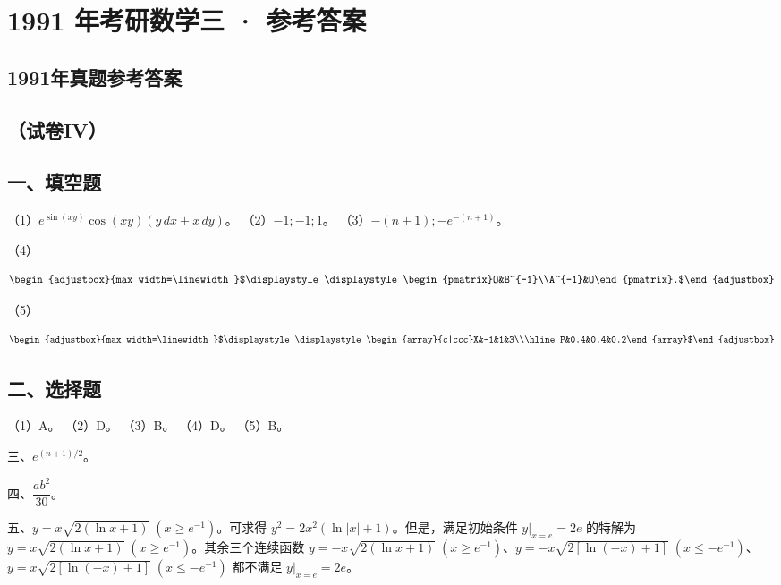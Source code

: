 \documentclass[UTF8,12pt]{ctexart}
\newcommand{\fitmath}[1]{\begin{adjustbox}{max width=\linewidth}$\displaystyle #1$\end{adjustbox}}
\begin{document}
\section*{1991 年考研数学三 · 参考答案}
\subsection*{1991年真题参考答案}

\subsection*{（试卷IV）}

\subsection*{一、填空题}

（1）\(\displaystyle e^{\sin(xy)}\cos(xy)(y\,dx+x\,dy)\)。 （2）\(\displaystyle -1;-1;1\)。 （3）\(\displaystyle -(n+1);-e^{-(n+1)}\)。


（4）


\[\fitmath{\displaystyle \begin{pmatrix}O&B^{-1}\\A^{-1}&O\end{pmatrix}.}\]


（5）


\[\fitmath{\displaystyle \begin{array}{c|ccc}X&-1&1&3\\\hline P&0.4&0.4&0.2\end{array}}\]


\subsection*{二、选择题}

（1）A。 （2）D。 （3）B。 （4）D。 （5）B。


三、\(\displaystyle e^{(n+1)/2}\)。


四、\(\displaystyle \dfrac{\displaystyle ab^2}{\displaystyle 30}\)。


五、\(\displaystyle y=x\sqrt{2(\ln x+1)}\;(x\ge e^{-1})\)。可求得 \(\displaystyle y^2=2x^2(\ln|x|+1)\)。但是，满足初始条件 \(\displaystyle y|_{x=e}=2e\) 的特解为 \(\displaystyle y=x\sqrt{2(\ln x+1)}\;(x\ge e^{-1})\)。其余三个连续函数 \(\displaystyle y=-x\sqrt{2(\ln x+1)}\;(x\ge e^{-1})\)、\(\displaystyle y=-x\sqrt{2[\ln(-x)+1]}\;(x\le-e^{-1})\)、\(\displaystyle y=x\sqrt{2[\ln(-x)+1]}\;(x\le-e^{-1})\) 都不满足 \(\displaystyle y|_{x=e}=2e\)。
\end{document}
